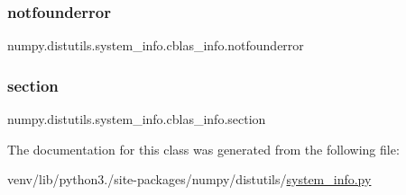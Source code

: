 \subsubsection{\texorpdfstring{notfounderror}{notfounderror}}
{\footnotesize\ttfamily numpy.\+distutils.\+system\+\_\+info.\+cblas\+\_\+info.\+notfounderror\hspace{0.3cm}{\ttfamily [static]}}

\mbox{\label{classnumpy_1_1distutils_1_1system__info_1_1cblas__info_a4c95f743c6ce660136d8ebc0aaeb6370}} 
\subsubsection{\texorpdfstring{section}{section}}
{\footnotesize\ttfamily numpy.\+distutils.\+system\+\_\+info.\+cblas\+\_\+info.\+section\hspace{0.3cm}{\ttfamily [static]}}



The documentation for this class was generated from the following file\+:\begin{DoxyCompactItemize}
\item 
venv/lib/python3./site-\/packages/numpy/distutils/\hyperlink{system__info_8py}{system\+\_\+info.\+py}\end{DoxyCompactItemize}
